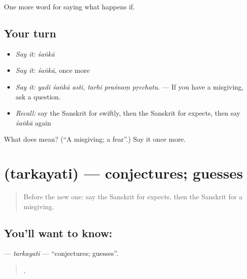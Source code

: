 \begin{grammarlens}[title={What you've built}]
One more word for saying what happens if.
\end{grammarlens}

\subsection*{Your turn}
\begin{itemize}
\raggedright
  \item \emph{Say it:} \emph{śaṅkā}
  \item \emph{Say it:} \emph{śaṅkā}, once more
  \item \emph{Say it:} \emph{yadi śaṅkā asti, tarhi praśnaṃ pṛcchatu.} — If you have a misgiving, ask a question.
  \item \emph{Recall:} say the Sanskrit for swiftly, then the Sanskrit for expects, then say \emph{śaṅkā} again
\end{itemize}

\begin{tcolorbox}[breakable,colback=teal!4,colframe=teal!35!black,title={Before you move on}]
What does  mean? (\textquotedblleft{}A misgiving; a fear\textquotedblright{}.) Say it once more.
\end{tcolorbox}
\section[\texorpdfstring{\sk{तर्कयति} (tarkayati)}{तर्कयति (tarkayati)}]{ (tarkayati) — conjectures; guesses}

\label{lesson:SA-C368-tarkayati}



\begin{quote}
Before the new one: say the Sanskrit for expects, then the Sanskrit for a misgiving.
\end{quote}

\subsection*{You'll want to know: }
\textbf{} — \emph{tarkayati} — \textquotedblleft{}conjectures; guesses\textquotedblright{}.

\begin{quote}
   ,     
\end{quote}

